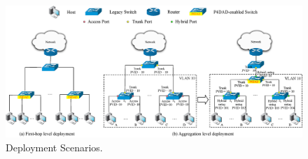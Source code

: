 \documentclass[journal]{IEEEtran}
\begin{document}

            \begin{figure}
                \centerline{
                    \includegraphics[scale=0.48]{figure/Deployment.eps}
                }
                \vspace{-0.2cm}
                \caption{Deployment Scenarios.}
                \label{fig:deployment}
                \vspace{-0.3cm}
            \end{figure}

            
\end{document}

